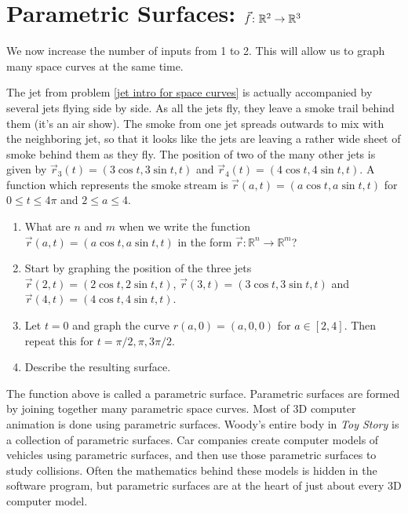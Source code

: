 \section{Parametric Surfaces: $\vec f\colon  \mathbb{R}^2 \to \mathbb{R}^3$}
We now increase the number of inputs from 1 to 2.  This will allow us to graph many space curves at the same time.

\begin{problem} \label{parametric surface example}%
%
 The jet from problem \ref{jet intro for space curves} is actually accompanied by several jets flying side by side. As all the jets fly, they leave a smoke trail behind them (it's an air show). The smoke from one jet spreads outwards to mix with the neighboring jet, so that it looks like the jets are leaving a rather wide sheet of smoke behind them as they fly. The position of two of the many other jets is given by $\vec r_3(t)=(3\cos t, 3\sin t, t)$ and $\vec r_4(t)=(4\cos t,4\sin t,t)$.  A function which represents the smoke stream is $\vec r(a,t)=(a\cos t, a\sin t, t)$ for $0\leq t\leq 4\pi$ and $2\leq a\leq 4$.
 \begin{enumerate}
  \item What are $n$ and $m$ when we write the function $\vec r(a,t)=(a\cos t, a\sin t, t)$ in the form  $\vec r\colon {\mathbb{R}}^n\to {\mathbb{R}}^m$?
  \item Start by graphing the position of the three jets $\vec r(2,t)=(2\cos t, 2\sin t, t)$, $\vec r(3,t)=(3\cos t, 3\sin t, t)$ and $\vec r(4,t)=(4\cos t,4\sin t,t)$.  
  \item Let $t=0$ and graph the curve $r(a,0)=(a,0,0)$ for $a\in[2,4]$.  Then repeat this for $t=\pi/2,\pi,3\pi/2$.
  \item Describe the resulting surface.
 \end{enumerate}
\end{problem}

The function above is called a parametric surface.  Parametric surfaces are formed by joining together many parametric space curves. Most of 3D computer animation is done using parametric surfaces. Woody's entire body in {\it Toy Story} is a collection of parametric surfaces. Car companies create computer models of vehicles using parametric surfaces, and then use those parametric surfaces to study collisions. Often the mathematics behind these models is hidden in the software program, but parametric surfaces are at the heart of just about every 3D computer model.

